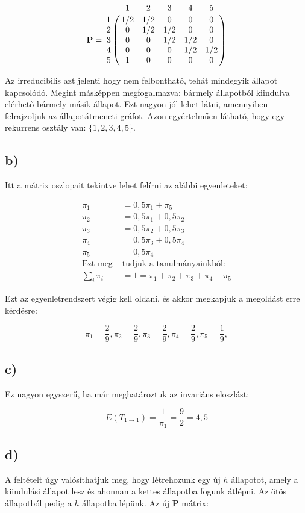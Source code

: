 \documentclass[a4paper,12pt]{article}   		%
\begin{document}
\[
\mathbf{P} = 
\bordermatrix{
~	&	1	&	2	&	3	&	4	&	5	\cr
1	&	1/2	&	1/2	&	0	&	0	&	0	\cr
2	&	0	&	1/2	&	1/2	&	0	&	0	\cr
3	&	0	&	0	&	1/2	&	1/2	&	0	\cr
4	&	0	&	0	&	0	&	1/2	&	1/2	\cr
5	&	1	&	0	&	0	&	0	&	0}
\]

Az irreducibilis azt jelenti hogy nem felbontható, tehát mindegyik 
állapot kapcsolódó. Megint másképpen megfogalmazva: bármely 
állapotból kiindulva elérhető bármely másik állapot. Ezt nagyon jól
lehet látni, amennyiben felrajzoljuk az állapotátmeneti gráfot.
Azon egyértelműen látható, hogy egy rekurrens osztály van:
$\{1, 2, 3, 4, 5\}$.

\subsection*{b)}
Itt a mátrix oszlopait tekintve lehet felírni az alábbi egyenleteket:

\begin{align*}
\pi_1 &= 0,5 \pi_1 + \pi_5 \\
\pi_2 &= 0,5 \pi_1 + 0,5 \pi_2 \\
\pi_3 &= 0,5 \pi_2 + 0,5 \pi_3 \\
\pi_4 &= 0,5 \pi_3 + 0,5 \pi_4 \\
\pi_5 &= 0,5 \pi_4 \\
\text{Ezt meg } &\text{tudjuk a tanulmányainkból:} \\
\sum_{i} \pi_i &= 1 = \pi_1 + \pi_2 + \pi_3 + \pi_4 + \pi_5
\end{align*}

Ezt az egyenletrendszert végig kell oldani, és akkor megkapjuk a
megoldást erre kérdésre:

\[
\pi_1 = \frac{2}{9},
\pi_2 = \frac{2}{9},
\pi_3 = \frac{2}{9},
\pi_4 = \frac{2}{9},
\pi_5 = \frac{1}{9},
\]

\subsection*{c)}
Ez nagyon egyszerű, ha már meghatároztuk az invariáns eloszlást:

\[
E(T_{1\to1}) = \frac{1}{\pi_1} = \frac{9}{2} = 4,5
\]

\subsection*{d)}
A feltételt úgy valósíthatjuk meg, hogy létrehozunk egy új $h$
állapotot, amely a kiindulási állapot lesz és ahonnan a kettes
állapotba fogunk átlépni. Az ötös állapotból pedig a $h$ állapotba 
lépünk. Az új $\mathbf{P}$ mátrix:
\end{document}
